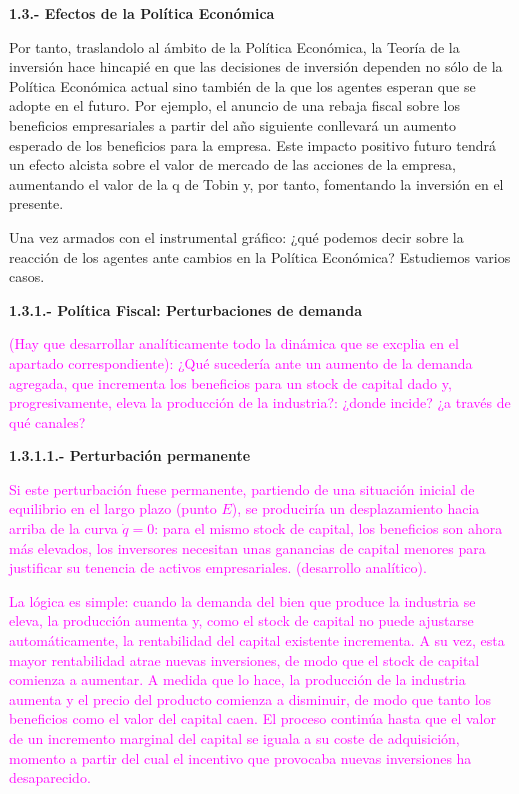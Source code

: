 \documentclass[10pt,a4paper]{article}
\begin{document}
\textbf{1.3.- Efectos de la Política Económica}

Por tanto, traslandolo al ámbito de la Política Económica, la Teoría de la inversión hace hincapié en que las decisiones de inversión dependen no sólo de la Política Económica actual sino también de la que los agentes esperan que se adopte en el futuro. Por ejemplo, el anuncio de una rebaja fiscal sobre los beneficios empresariales a partir del año siguiente conllevará un aumento esperado de los beneficios para la empresa. Este impacto positivo futuro tendrá un efecto alcista sobre el valor de mercado de las acciones de la empresa, aumentando el valor de la q de Tobin y, por tanto, fomentando la inversión en el presente.

Una vez armados con el instrumental gráfico: ¿qué podemos decir sobre la reacción de los agentes ante cambios en la Política Económica? Estudiemos varios casos. 

\textbf{1.3.1.- Política Fiscal: Perturbaciones de demanda}

\textcolor{magenta}{(Hay que desarrollar analíticamente todo la dinámica que se excplia en el apartado correspondiente): ¿Qué sucedería ante un aumento de la demanda agregada, que incrementa los beneficios para un stock de capital dado y, progresivamente, eleva la producción de la industria?: ¿donde incide? ¿a través de qué canales?}

\textbf{1.3.1.1.- Perturbación permanente}

\textcolor{magenta}{Si este perturbación fuese permanente, partiendo de una situación inicial de equilibrio en el largo plazo (punto $E$), se produciría un desplazamiento hacia arriba de la curva $\dot q=0$: para el mismo stock de capital, los beneficios son ahora más elevados, los inversores necesitan unas ganancias de capital menores para justificar su tenencia de activos empresariales. (desarrollo analítico).

La lógica es simple: cuando la demanda del bien que produce la industria se eleva, la producción aumenta y, como el stock de capital no puede ajustarse automáticamente, la rentabilidad del capital existente incrementa. A su vez, esta mayor rentabilidad atrae nuevas inversiones, de modo que el stock de capital comienza a aumentar. A medida que lo hace, la producción de la industria aumenta y el precio del producto comienza a disminuir, de modo que tanto los beneficios como el valor del capital caen. El proceso continúa hasta que el valor de un incremento marginal del capital se iguala a su coste de adquisición, momento a partir del cual el incentivo que provocaba nuevas inversiones ha desaparecido. }
\end{document}
